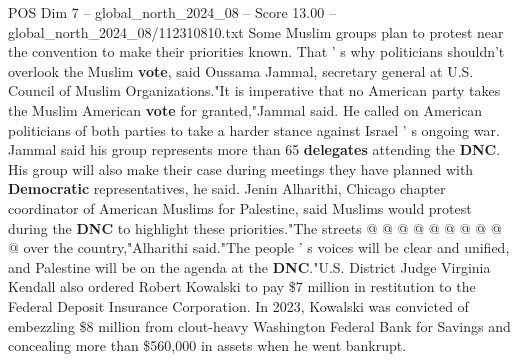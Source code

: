 \begin{textsample}{POS Dim 7 – global\_north\_2024\_08 – Score 13.00 – global\_north\_2024\_08/112310810.txt}
Some Muslim groups plan to protest near the convention to make their priorities known.
That ' s why politicians shouldn't overlook the Muslim \textbf{vote}, said Oussama Jammal, secretary general at U.S.
Council of Muslim Organizations."It is imperative that no American party takes the Muslim American \textbf{vote} for granted,"Jammal said.
He called on American politicians of both parties to take a harder stance against Israel ' s ongoing war.
Jammal said his group represents more than 65 \textbf{delegates} attending the \textbf{DNC}.
His group will also make their case during meetings they have planned with \textbf{Democratic} representatives, he said.
Jenin Alharithi, Chicago chapter coordinator of American Muslims for Palestine, said Muslims would protest during the \textbf{DNC} to highlight these priorities."The streets @ @ @ @ @ @ @ @ @ @ over the country,"Alharithi said."The people ' s voices will be clear and unified, and Palestine will be on the agenda at the \textbf{DNC}."U.S.
District Judge Virginia Kendall also ordered Robert Kowalski to pay \$7 million in restitution to the Federal Deposit Insurance Corporation.
In 2023, Kowalski was convicted of embezzling \$8 million from clout-heavy Washington Federal Bank for Savings and concealing more than \$560,000 in assets when he went bankrupt.

\end{textsample}
